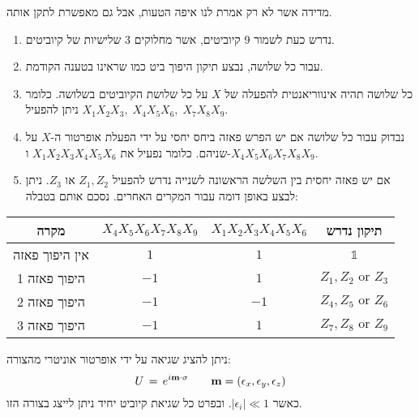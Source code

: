 \documentclass{tstextbook}
\begin{document}
\begin{definition}
מדידה אשר לא רק אמרת לנו איפה הטעות, אבל גם מאפשרת לתקן אותה.

\end{definition}
\begin{proposition}
  \begin{enumerate}
    \item נדרש כעת לשמור 9 קיוביטים, אשר מחלוקים 3 שלישיות של קיוביטים. 


    \item עבור כל שלושה, נבצע תיקון היפוך ביט כמו שראינו בטענה הקודמת. 


    \item כל שלושה תהיה אינווריאנטית להפעלה של \(X\) על כל שלושת הקיוביטים בשלושה. כלומר ניתן להפעיל \(X_{1}X_{2}X_{3},\;X_{4}X_{5}X_{6},\;X_{7}X_{8}X_{9}\). 


    \item נבדוק עבור כל שלושה אם יש הפרש פאזה ביחס יחסי על ידי הפעלת אופרטור ה-\(X\) על שניהם. כלומר נפעיל את \(X_{1}X_{2}X_{3}X_{4}X_{5}X_{6}\) ו-\(X_{4}X_{5}X_{6}X_{7}X_{8}X_{9}\).  


    \item אם יש פאזה יחסית בין השלשה הראשונה לשנייה נדרש להפעיל \(Z_{1},Z_{2}\) או \(Z_{3}\).  ניתן לבצע באופן דומה עבור המקרים האחרים. נסכם אותם בטבלה: 


  \end{enumerate}
  \begin{table}[htbp]
    \centering
    \begin{tabular}{|cccc|}
      \hline
      מקרה & \(X_{4}X_{5}X_{6}X_{7}X_{8}X_{9}\) & \(X_{1}X_{2}X_{3}X_{4}X_{5}X_{6}\) & תיקון נדרש \\ \hline
      אין היפוך פאזה & \(1\) & \(1\) & \(\mathbb{1}\) \\ \hline
      היפוך פאזה 1 & \(-1\) & \(1\) & \(Z_{1},Z_{2}\text{ or }Z_{3}\) \\ \hline
      היפוך פאזה 2 & \(-1\) & \(-1\) & \(Z_{4},Z_{5}\text{ or }Z_{6}\) \\ \hline
      היפוך פאזה 3 & \(-1\) & \(1\) & \(Z_{7},Z_{8}\text{ or }Z_{9}\) \\ \hline
    \end{tabular}
  \end{table}
\end{proposition}
\begin{proposition}
ניתן להציג שגיאה על ידי אופרטור אוניטרי מהצורה:
$$U\,=\,e^{i{\bf m}\cdot\sigma}\qquad {\bf m}=\left(\epsilon_{x},\epsilon_{y},\epsilon_{z}\right)$$
כאשר \(\left\lvert  \epsilon_{i}  \right\rvert\ll 1\). ובפרט כל שגיאת קיוביט יחיד ניתן לייצג בצורה הזו.

\end{proposition}
\end{document}
